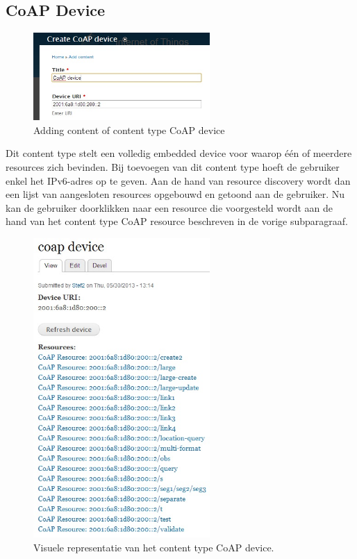 \subsection{CoAP Device}
\begin{figure}
\vspace{-10pt}
\centering
\label{fig:addCoapDevice}
\includegraphics[width=0.6\textwidth]{fig/add_coap_device}
\vspace{-20pt}
\centering
\caption{Adding content of content type CoAP device}
\centering
\vspace{-20pt}
\end{figure}
Dit content type stelt een volledig embedded device voor waarop \'{e}\'{e}n of meerdere resources zich bevinden. Bij toevoegen van dit content type hoeft de gebruiker enkel het IPv6-adres op te geven. Aan de hand van resource discovery wordt dan een lijst van aangesloten resources opgebouwd en getoond aan de gebruiker. Nu kan de gebruiker doorklikken naar een resource die voorgesteld wordt aan de hand van het content type CoAP resource beschreven in de vorige subparagraaf.
\begin{figure}[h!]
\centering
\includegraphics[width=0.6\textwidth]{fig/coap_device}
\caption{Visuele representatie van het content type CoAP device.}
\label{fig:coapDevice}
\end{figure}

